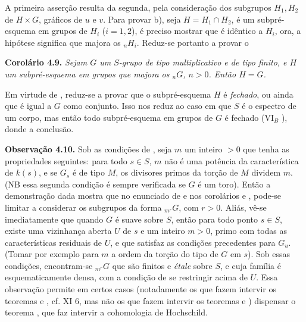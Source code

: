 A primeira asserção resulta da segunda, pela consideração dos
subgrupos \(H_1,H_2\) de \(H\times G\), gráficos de \(u\) e
\(v\). Para provar b), seja \(H=H_1\cap H_2\), é um
subpré-esquema em grupos de \(H_i\) (\(i=1,2\)), é preciso
mostrar que é idêntico a \(H_i\), ora, a hipótese significa que
majora os \({}_nH_i\). Reduz-se portanto a provar o

\medskip
\noindent{}\textbf{Corolário 4.9.}
\textit{Sejam \(G\) um \(S\)-grupo de tipo multiplicativo e de
tipo finito, e \(H\) um subpré-esquema em grupos que majora os
\({}_nG\), \(n>0\). Então \(H=G\).}

Em virtude de , reduz-se
a provar que o subpré-esquema \(H\) é \emph{fechado}, ou ainda
que é igual a \(G\) como conjunto. Isso nos reduz ao caso em que
\(S\) é o espectro de um corpo, mas então todo subpré-esquema em
grupos de \(G\) é fechado (VI\(_B\)
), donde a conclusão.

\medskip
\noindent{}\textbf{Observação 4.10.}
Sob as condições de , seja
\(m\) um inteiro \(>0\) que tenha as propriedades seguintes:
para todo \(s\in S\), \(m\) não é uma potência da característica
de \(k(s)\), e se \(G_s\) é de tipo \(M\), os divisores primos
da torção de \(M\) dividem \(m\). (NB essa segunda condição é
sempre verificada se \(G\) é um toro). Então a demonstração dada
mostra que no enunciado de
 e nos corolários
 e
, pode-se limitar a
considerar os subgrupos da forma \({}_{m^r}G\), com \(r>0\).
Aliás, vê-se imediatamente que quando \(G\) é suave sobre \(S\),
então para todo ponto \(s\in S\), existe uma vizinhança aberta
\(U\) de \(s\) e um inteiro \(m>0\), primo com todas as
características residuais de \(U\), e que satisfaz as condições
precedentes para \(G_u\). (Tomar por exemplo para \(m\) a ordem
da torção do tipo de \(G\) em \(s\)). Sob essas condições,
encontram-se \({}_{m^r}G\) que são finitos e \emph{étale} sobre
\(S\), e cuja família é esquematicamente densa, com a condição
de se restringir acima de \(U\). Essa observação permite em
certos casos (notadamente os que fazem intervir os teoremas
 e
, cf. XI 6, mas
não os que fazem intervir os teoremas
 e
) dispensar o
teorema , que faz
intervir a cohomologia de Hochschild.
